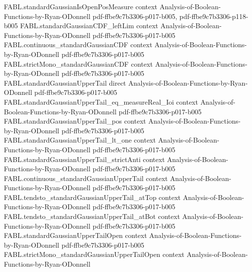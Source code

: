 \begin{theorem}
\label{FABL.standardGaussianUpperQuantile_isEquivalent_sqrt_log_inv}
\leanok
{}
\proofstep
  {FABL.standardGaussianIsOpenPosMeasure}
  {context}
  {Analysis-of-Boolean-Functions-by-Ryan-ODonnell}
  {pdf-ffbe9c7b3306-p017-b005,
    pdf-ffbe9c7b3306-p118-b005}
\proofstep
  {FABL.standardGaussianCDF_leftLim}
  {context}
  {Analysis-of-Boolean-Functions-by-Ryan-ODonnell}
  {pdf-ffbe9c7b3306-p017-b005}
\proofstep
  {FABL.continuous_standardGaussianCDF}
  {context}
  {Analysis-of-Boolean-Functions-by-Ryan-ODonnell}
  {pdf-ffbe9c7b3306-p017-b005}
\proofstep
  {FABL.strictMono_standardGaussianCDF}
  {context}
  {Analysis-of-Boolean-Functions-by-Ryan-ODonnell}
  {pdf-ffbe9c7b3306-p017-b005}
\proofstep
  {FABL.standardGaussianUpperTail}
  {direct}
  {Analysis-of-Boolean-Functions-by-Ryan-ODonnell}
  {pdf-ffbe9c7b3306-p017-b005}
\proofstep
  {FABL.standardGaussianUpperTail_eq_measureReal_Ioi}
  {context}
  {Analysis-of-Boolean-Functions-by-Ryan-ODonnell}
  {pdf-ffbe9c7b3306-p017-b005}
\proofstep
  {FABL.standardGaussianUpperTail_pos}
  {context}
  {Analysis-of-Boolean-Functions-by-Ryan-ODonnell}
  {pdf-ffbe9c7b3306-p017-b005}
\proofstep
  {FABL.standardGaussianUpperTail_lt_one}
  {context}
  {Analysis-of-Boolean-Functions-by-Ryan-ODonnell}
  {pdf-ffbe9c7b3306-p017-b005}
\proofstep
  {FABL.standardGaussianUpperTail_strictAnti}
  {context}
  {Analysis-of-Boolean-Functions-by-Ryan-ODonnell}
  {pdf-ffbe9c7b3306-p017-b005}
\proofstep
  {FABL.continuous_standardGaussianUpperTail}
  {context}
  {Analysis-of-Boolean-Functions-by-Ryan-ODonnell}
  {pdf-ffbe9c7b3306-p017-b005}
\proofstep
  {FABL.tendsto_standardGaussianUpperTail_atTop}
  {context}
  {Analysis-of-Boolean-Functions-by-Ryan-ODonnell}
  {pdf-ffbe9c7b3306-p017-b005}
\proofstep
  {FABL.tendsto_standardGaussianUpperTail_atBot}
  {context}
  {Analysis-of-Boolean-Functions-by-Ryan-ODonnell}
  {pdf-ffbe9c7b3306-p017-b005}
\proofstep
  {FABL.standardGaussianUpperTailOpen}
  {context}
  {Analysis-of-Boolean-Functions-by-Ryan-ODonnell}
  {pdf-ffbe9c7b3306-p017-b005}
\proofstep
  {FABL.strictMono_standardGaussianUpperTailOpen}
  {context}
  {Analysis-of-Boolean-Functions-by-Ryan-ODonnell}

\end{theorem}
